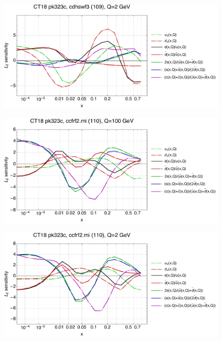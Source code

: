 \documentclass[10pt,aps,prd,floatfix,titlepage]{revtex4}
\begin{document}
\begin{figure}
\includegraphics[width=\textwidth,height=0.44\textheight,keepaspectratio]{2/109_ct18nn_q2_Sf_2.pdf}
\caption{}
\end{figure}
\clearpage
\begin{figure}
\includegraphics[width=\textwidth,height=0.44\textheight,keepaspectratio]{2/110_ct18nn_q100_Sf_2.pdf}
\caption{}
\end{figure}
\begin{figure}
\includegraphics[width=\textwidth,height=0.44\textheight,keepaspectratio]{2/110_ct18nn_q2_Sf_2.pdf}
\caption{}
\end{figure}
\end{document}
